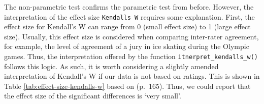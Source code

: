 \documentclass[
]{book}
\newenvironment{Shaded}{\begin{snugshade}}{\end{snugshade}}
\newcommand{\AttributeTok}[1]{\textcolor[rgb]{0.77,0.63,0.00}{#1}}
\newcommand{\CommentTok}[1]{\textcolor[rgb]{0.56,0.35,0.01}{\textit{#1}}}
\newcommand{\DocumentationTok}[1]{\textcolor[rgb]{0.56,0.35,0.01}{\textbf{\textit{#1}}}}
\newcommand{\FunctionTok}[1]{\textcolor[rgb]{0.00,0.00,0.00}{#1}}
\newcommand{\NormalTok}[1]{#1}
\newcommand{\OtherTok}[1]{\textcolor[rgb]{0.56,0.35,0.01}{#1}}
\newcommand{\SpecialCharTok}[1]{\textcolor[rgb]{0.00,0.00,0.00}{#1}}
\begin{document}
\begin{Shaded}
\end{Shaded}

The non-parametric test confirms the parametric test from before. However, the interpretation of the effect size \texttt{Kendall\textquotesingle{}s\ W} requires some explanation. First, the effect size for Kendall's W can range from 0 (small effect size) to 1 (large effect size). Usually, this effect size is considered when comparing inter-rater agreement, for example, the level of agreement of a jury in ice skating during the Olympic games. Thus, the interpretation offered by the function \texttt{itnerpret\_kendalls\_w()} follows this logic. As such, it is worth considering a slightly amended interpretation of Kendall's W if our data is not based on ratings. This is shown in Table \ref{tab:effect-size-kendalls-w} based on \citet{landis1977measurement} (p.~165). Thus, we could report that the effect size of the significant differences is `very small'.
\end{document}
